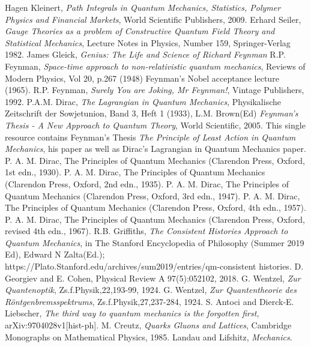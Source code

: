 \documentclass[12pt]{article}
\begin{document}
\begin{thebibliography}{}
 Hagen Kleinert, {\it Path Integrals in Quantum Mechanics, Statistics, Polymer Physics and Financial Markets}, World
Scientific Publishers, 2009.
 Erhard Seiler, {\it Gauge Theories as a problem of Constructive Quantum Field Theory and Statistical Mechanics}, Lecture
Notes in Physics, Number 159, Springer-Verlag 1982.
 James Gleick, {\it Genius: The Life and Science of Richard Feynman}
 R.P. Feynman, {\it Space-time approach to non-relativistic quantum mechanics}, Reviews of Modern Physics, Vol 20, p.267
(1948)
 Feynman's Nobel acceptance lecture (1965).
 R.P. Feynman, {\it Surely You are Joking, Mr Feynman!}, Vintage Publishers, 1992.
 P.A.M. Dirac, {\it The Lagrangian in Quantum Mechanics}, 
Physikalische Zeitschrift der Sowjetunion, Band 3, Heft 1 (1933),
 L.M. Brown(Ed) {\it Feynman's Thesis - A New Approach to Quantum Theory}, World Scientific, 2005. This single
resource contains Feynman's Thesis {\it The Principle of Least Action in Quantum Mechanics}, his paper as well as Dirac's Lagrangian in Quantum Mechanics paper.
 P. A. M. Dirac, The Principles of Quantum Mechanics (Clarendon Press, Oxford, 1st edn., 1930). 
 P. A. M. Dirac, The Principles of Quantum Mechanics (Clarendon Press, Oxford, 2nd edn., 1935). 
 P. A. M. Dirac, The Principles of Quantum Mechanics (Clarendon Press, Oxford, 3rd edn., 1947). 
 P. A. M. Dirac, The Principles of Quantum Mechanics (Clarendon Press, Oxford, 4th edn., 1957). 
 P. A. M. Dirac, The Principles of Quantum Mechanics (Clarendon Press, Oxford, revised 4th edn., 1967). 
 R.B. Griffiths, {\it The Consistent Histories Approach to Quantum Mechanics}, in The Stanford Encyclopedia of
Philosophy (Summer 2019 Ed), Edward N Zalta(Ed.); https://Plato.Stanford.edu/archives/sum2019/entries/qm-consistent histories.
 D. Georgiev and E. Cohen, Physical Review A 97(5):052102, 2018.
 G. Wentzel, {\it Zur Quantenoptik}, Zs.f.Physik,22,193-99, 1924.
 G. Wentzel, {\it Zur Quantentheorie des R\"ontgenbremsspektrums}, Zs.f.Physik,27,237-284, 1924.
 S. Antoci and Dierck-E. Liebscher, {\it The third way to quantum mechanics is the forgotten first}, arXiv:9704028v1[hist-ph].
 M. Creutz, {\it Quarks Gluons and Lattices}, Cambridge Monographs on Mathematical Physics, 1985.
 Landau and Lifshitz, {\it Mechanics}.
\end{thebibliography}
\end{document}
